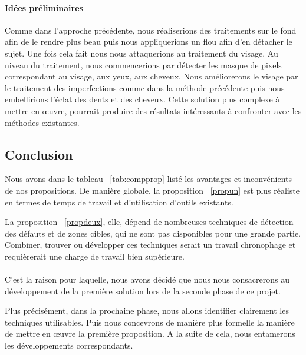 \documentclass[11pt, french,screen]{report-rd-info}
\begin{document}
\paragraph{Idées préliminaires}
Comme dans l’approche précédente, nous réaliserions des traitements sur le fond afin de le rendre plus beau puis nous appliquerions un flou afin d’en détacher le sujet. Une fois cela fait nous nous attaquerions au traitement du visage. Au niveau du traitement, nous commencerions par détecter les masque de pixels correspondant au visage, aux yeux, aux cheveux. Nous améliorerons le visage par le traitement des imperfections comme dans la méthode précédente puis nous embellirions l’éclat des dents et des cheveux.
Cette solution plus complexe à mettre en œuvre, pourrait produire des résultats intéressants à confronter avec les méthodes existantes.
\subsection{Conclusion}
Nous avons dans le tableau ~\ref{tab:compprop} listé les avantages et inconvénients de nos propositions. De manière globale, la proposition ~\ref{propun} est plus réaliste en termes de temps de travail et d’utilisation d’outils existants. 

La proposition ~\ref{propdeux}, elle, dépend de nombreuses techniques de détection des défauts et de zones cibles, qui ne sont pas disponibles pour une grande partie. Combiner, trouver ou développer ces techniques serait un travail chronophage et requièrerait une charge de travail bien supérieure. 
\paragraph*{}
C’est la raison pour laquelle, nous avons décidé que nous nous consacrerons au développement de la première solution lors de la seconde phase de ce projet.

Plus précisément, dans la prochaine phase, nous allons identifier clairement les techniques utilisables. Puis nous concevrons de manière plus formelle la manière de mettre en œuvre la première proposition. A la suite de cela, nous entamerons les développements correspondants.
\end{document}

